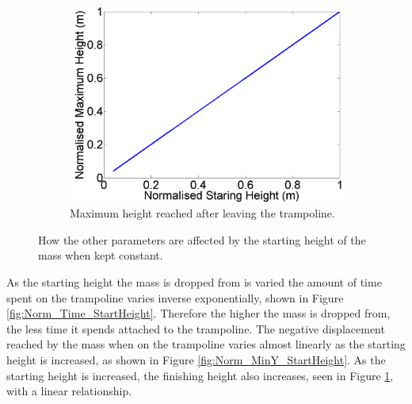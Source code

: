 \begin{figure}[H]
\begin{subfigure}[t]{0.3\textwidth}
		\includegraphics[width=\textwidth]{Norm_Height_StartHeight.png}
    	\caption{Maximum height reached after leaving the trampoline.}\label{fig:Norm_Height_StartHeight}
    \end{subfigure}\hfill
    \caption{How the other parameters are affected by the starting height of the mass when kept constant.}\label{fig:Norm_StartHeight}
\end{figure}
\noindent As the starting height the mass is dropped from is varied the amount of time spent on the trampoline varies inverse exponentially, shown in Figure \ref{fig:Norm_Time_StartHeight}. Therefore the higher the mass is dropped from, the less time it spends attached to the trampoline.
The negative displacement reached by the mass when on the trampoline varies almost linearly as the starting height is increased, as shown in Figure \ref{fig:Norm_MinY_StartHeight}. As the starting height is increased, the finishing height also increases, seen in Figure \ref{fig:Norm_Height_StartHeight}, with a linear relationship.


